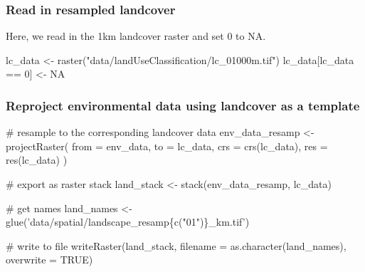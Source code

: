 \documentclass[]{article}
\newenvironment{Shaded}{}{}
\newcommand{\CommentTok}[1]{\textcolor[rgb]{0.00,0.50,0.00}{#1}}
\newcommand{\DataTypeTok}[1]{#1}
\newcommand{\DecValTok}[1]{#1}
\newcommand{\KeywordTok}[1]{\textcolor[rgb]{0.00,0.00,1.00}{#1}}
\newcommand{\NormalTok}[1]{#1}
\newcommand{\OperatorTok}[1]{#1}
\newcommand{\OtherTok}[1]{\textcolor[rgb]{1.00,0.25,0.00}{#1}}
\newcommand{\StringTok}[1]{\textcolor[rgb]{0.00,0.50,0.50}{#1}}
\begin{document}
\hypertarget{read-in-resampled-landcover}{%
\subsubsection{Read in resampled landcover}\label{read-in-resampled-landcover}}

Here, we read in the 1km landcover raster and set 0 to NA.

\begin{Shaded}
\begin{Highlighting}[numbers=left,,]
\NormalTok{lc_data <-}\StringTok{ }\KeywordTok{raster}\NormalTok{(}\StringTok{"data/landUseClassification/lc_01000m.tif"}\NormalTok{)}
\NormalTok{lc_data[lc_data }\OperatorTok{==}\StringTok{ }\DecValTok{0}\NormalTok{] <-}\StringTok{ }\OtherTok{NA}
\end{Highlighting}
\end{Shaded}

\hypertarget{reproject-environmental-data-using-landcover-as-a-template}{%
\subsubsection{Reproject environmental data using landcover as a template}\label{reproject-environmental-data-using-landcover-as-a-template}}

\begin{Shaded}
\begin{Highlighting}[numbers=left,,]

\CommentTok{# resample to the corresponding landcover data}
\NormalTok{env_data_resamp <-}\StringTok{ }\KeywordTok{projectRaster}\NormalTok{(}
  \DataTypeTok{from =}\NormalTok{ env_data, }\DataTypeTok{to =}\NormalTok{ lc_data,}
  \DataTypeTok{crs =} \KeywordTok{crs}\NormalTok{(lc_data), }\DataTypeTok{res =} \KeywordTok{res}\NormalTok{(lc_data)}
\NormalTok{)}

\CommentTok{# export as raster stack}
\NormalTok{land_stack <-}\StringTok{ }\KeywordTok{stack}\NormalTok{(env_data_resamp, lc_data)}

\CommentTok{# get names}
\NormalTok{land_names <-}\StringTok{ }\KeywordTok{glue}\NormalTok{(}\StringTok{'data/spatial/landscape_resamp\{c("01")\}_km.tif'}\NormalTok{)}

\CommentTok{# write to file}
\KeywordTok{writeRaster}\NormalTok{(land_stack, }\DataTypeTok{filename =} \KeywordTok{as.character}\NormalTok{(land_names), }\DataTypeTok{overwrite =} \OtherTok{TRUE}\NormalTok{)}
\end{Highlighting}
\end{Shaded}
\end{document}
